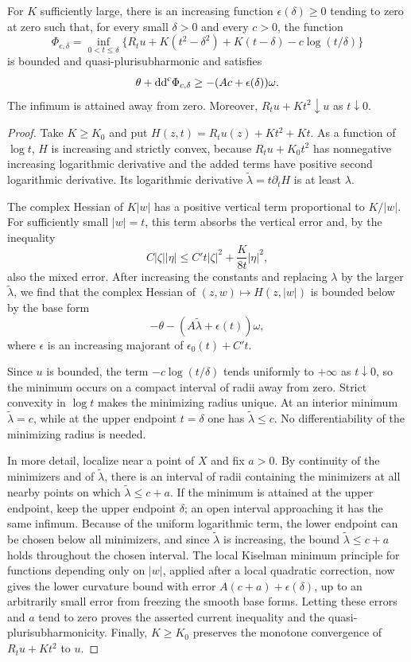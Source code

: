\begin{lemma}\label{lem:general-kiselman-modulus}
For $K$ sufficiently large, there is an increasing function $\epsilon(\delta)\geq0$ tending to zero at zero such that, for every small $\delta>0$ and every $c>0$, the function
\[
 \Phi_{c,\delta}
   =\inf_{0<t\leq\delta}
      \{R_tu+K(t^2-\delta^2)+K(t-\delta)-c\log(t/\delta)\}
\]
is bounded and quasi-plurisubharmonic and satisfies
\[
 \theta+\mathrm{dd}^{\mathrm{c}}\Phi_{c,\delta}
                       \geq-(Ac+\epsilon(\delta))\omega.
\]
The infimum is attained away from zero. Moreover, $R_tu+Kt^2\downarrow u$ as $t\downarrow0$.
\end{lemma}
\begin{proof}
Take $K\geq K_0$ and put $H(z,t)=R_tu(z)+Kt^2+Kt$. As a function of $\log t$, $H$ is increasing and strictly convex, because $R_tu+K_0t^2$ has nonnegative increasing logarithmic derivative and the added terms have positive second logarithmic derivative. Its logarithmic derivative $\widetilde\lambda=t\partial_tH$ is at least $\lambda$.

The complex Hessian of $K|w|$ has a positive vertical term proportional to $K/|w|$. For sufficiently small $|w|=t$, this term absorbs the vertical error and, by the inequality
\[
 C|\zeta||\eta|
       \leq C' t|\zeta|^2+\frac{K}{8t}|\eta|^2,
\]
also the mixed error. After increasing the constants and replacing $\lambda$ by the larger $\widetilde\lambda$, we find that the complex Hessian of $(z,w)\mapsto H(z,|w|)$ is bounded below by the base form
\[
 -\theta-(A\widetilde\lambda+\epsilon(t))\omega,
\]
where $\epsilon$ is an increasing majorant of $\epsilon_0(t)+C't$.

Since $u$ is bounded, the term $-c\log(t/\delta)$ tends uniformly to $+\infty$ as $t\downarrow0$, so the minimum occurs on a compact interval of radii away from zero. Strict convexity in $\log t$ makes the minimizing radius unique. At an interior minimum $\widetilde\lambda=c$, while at the upper endpoint $t=\delta$ one has $\widetilde\lambda\leq c$. No differentiability of the minimizing radius is needed.

In more detail, localize near a point of $X$ and fix $a>0$. By continuity of the minimizers and of $\widetilde\lambda$, there is an interval of radii containing the minimizers at all nearby points on which $\widetilde\lambda\leq c+a$. If the minimum is attained at the upper endpoint, keep the upper endpoint $\delta$; an open interval approaching it has the same infimum. Because of the uniform logarithmic term, the lower endpoint can be chosen below all minimizers, and since $\widetilde\lambda$ is increasing, the bound $\widetilde\lambda\leq c+a$ holds throughout the chosen interval. The local Kiselman minimum principle for functions depending only on $|w|$, applied after a local quadratic correction, now gives the lower curvature bound with error $A(c+a)+\epsilon(\delta)$, up to an arbitrarily small error from freezing the smooth base forms. Letting these errors and $a$ tend to zero proves the asserted current inequality and the quasi-plurisubharmonicity. Finally, $K\geq K_0$ preserves the monotone convergence of $R_tu+Kt^2$ to $u$.
\end{proof}

